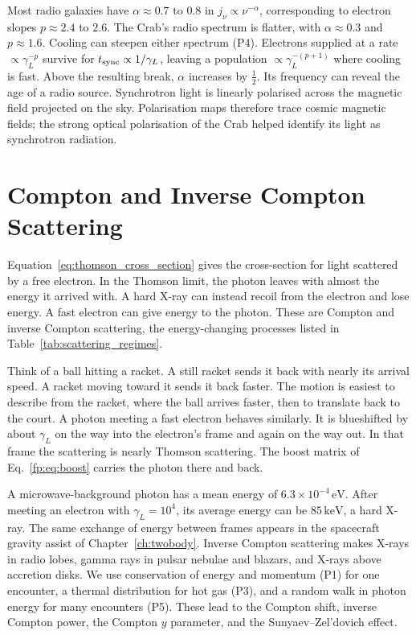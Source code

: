 Most radio galaxies have $\alpha\approx0.7$ to $0.8$ in $j_\nu\propto\nu^{-\alpha}$, corresponding to electron slopes $p\approx2.4$ to $2.6$. The Crab's radio spectrum is flatter, with $\alpha\approx0.3$ and $p\approx1.6$. Cooling can steepen either spectrum (P4). Electrons supplied at a rate $\propto\gamma_L^{-p}$ survive for $t_{\rm sync}\propto1/\gamma_L$, leaving a population $\propto\gamma_L^{-(p+1)}$ where cooling is fast. Above the resulting break, $\alpha$ increases by $\tfrac12$. Its frequency can reveal the age of a radio source. Synchrotron light is linearly polarised across the magnetic field projected on the sky. Polarisation maps therefore trace cosmic magnetic fields; the strong optical polarisation of the Crab helped identify its light as synchrotron radiation.

\section{Compton and Inverse Compton Scattering}
\label{fp:sec:compton}

Equation~\eqref{eq:thomson_cross_section} gives the cross-section for light scattered by a free electron. In the Thomson limit, the photon leaves with almost the energy it arrived with. A hard X-ray can instead recoil from the electron and lose energy. A fast electron can give energy to the photon. These are Compton and inverse Compton scattering, the energy-changing processes listed in Table~\ref{tab:scattering_regimes}.

Think of a ball hitting a racket. A still racket sends it back with nearly its arrival speed. A racket moving toward it sends it back faster. The motion is easiest to describe from the racket, where the ball arrives faster, then to translate back to the court. A photon meeting a fast electron behaves similarly. It is blueshifted by about $\gamma_L$ on the way into the electron's frame and again on the way out. In that frame the scattering is nearly Thomson scattering. The boost matrix of Eq.~\eqref{fp:eq:boost} carries the photon there and back.

A microwave-background photon has a mean energy of $6.3\times10^{-4}\,\mathrm{eV}$. After meeting an electron with $\gamma_L=10^4$, its average energy can be $85\,\mathrm{keV}$, a hard X-ray. The same exchange of energy between frames appears in the spacecraft gravity assist of Chapter~\ref{ch:twobody}. Inverse Compton scattering makes X-rays in radio lobes, gamma rays in pulsar nebulae and blazars, and X-rays above accretion disks. We use conservation of energy and momentum (P1) for one encounter, a thermal distribution for hot gas (P3), and a random walk in photon energy for many encounters (P5). These lead to the Compton shift, inverse Compton power, the Compton $y$ parameter, and the Sunyaev–Zel'dovich effect.

